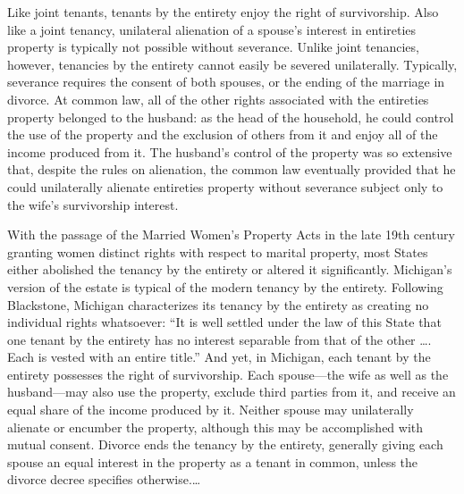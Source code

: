Like joint tenants, tenants by the entirety enjoy the right of survivorship.
Also like a joint tenancy, unilateral alienation of a spouse's interest in
entireties property is typically not possible without severance. Unlike joint
tenancies, however, tenancies by the entirety cannot easily be severed
unilaterally. Typically, severance requires the consent of both spouses, or the
ending of the marriage in divorce. At common law, all of the other rights
associated with the entireties property belonged to the husband: as the head of
the household, he could control the use of the property and the exclusion of
others from it and enjoy all of the income produced from it. The husband's
control of the property was so extensive that, despite the rules on alienation,
the common law eventually provided that he could unilaterally alienate
entireties property without severance subject only to the wife's survivorship
interest.

With the passage of the Married Women's Property Acts in the late 19th century
granting women distinct rights with respect to marital property, most States
either abolished the tenancy by the entirety or altered it significantly.
Michigan's version of the estate is typical of the modern tenancy by the
entirety. Following Blackstone, Michigan characterizes its tenancy by the
entirety as creating no individual rights whatsoever: ``It is well settled
under the law of this State that one tenant by the entirety has no interest
separable from that of the other \dots. Each is vested with an entire
title.'' And yet, in Michigan, each tenant by the entirety possesses the right
of survivorship. Each spouse---the wife as well as the husband---may also use
the property, exclude third parties from it, and receive an equal share of the
income produced by it. Neither spouse may unilaterally alienate or encumber the
property, although this may be accomplished with mutual consent. Divorce ends
the tenancy by the entirety, generally giving each spouse an equal interest in
the property as a tenant in common, unless the divorce decree specifies
otherwise.\dots

